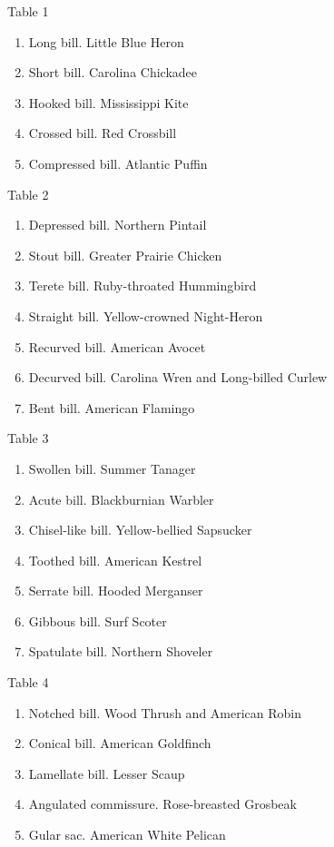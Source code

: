 \documentclass[10pt]{article}
\begin{document}

\begin{multicols}{2}


Table 1
\begin{enumerate}
\item  Long bill. Little Blue Heron
\item  Short bill. Carolina Chickadee
\item  Hooked bill. Mississippi Kite
\item  Crossed bill. Red Crossbill
\item  Compressed bill. Atlantic Puffin
\end{enumerate}

Table 2
\begin{enumerate}[resume]
\item  Depressed bill. Northern Pintail
\item  Stout bill. Greater Prairie Chicken
\item  Terete bill. Ruby-throated Hummingbird
\item  Straight bill. Yellow-crowned Night-Heron
\item  Recurved bill. American Avocet
\item  Decurved bill. Carolina Wren and Long-billed Curlew
\item  Bent bill. American Flamingo
\end{enumerate}

Table 3
\begin{enumerate}[resume]
\item  Swollen bill. Summer Tanager
\item  Acute bill. Blackburnian Warbler
\item  Chisel-like bill. Yellow-bellied Sapsucker
\item  Toothed bill. American Kestrel
\item  Serrate bill. Hooded Merganser
\item  Gibbous bill. Surf Scoter
\item  Spatulate bill. Northern Shoveler
\end{enumerate}

Table 4
\begin{enumerate}[resume]
\item Notched bill. Wood Thrush and American Robin
\item Conical bill. American Goldfinch
\item Lamellate bill. Lesser Scaup
\item Angulated commissure. Rose-breasted Grosbeak
\item Gular sac. American White Pelican
\end{enumerate}


\end{multicols}
\end{document}
